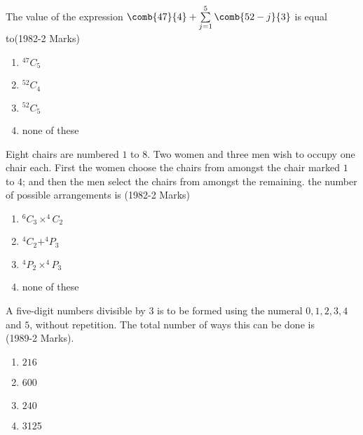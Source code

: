 \iffalse
\title{Assignments}
\author{Mokshith ee24btech11009}
\section{mcq-single}
\fi
    \item  The value of the expression $\comb{47}{4}+\sum\limits_{j=1}^{5} \comb{52-j}{3}$ is equal to\hfill{(1982-2 Marks)}\\
\begin{multicols}{2} 
\begin{enumerate}
\item $^{47}C_5$
\item$^{52}C_4$
\columnbreak
\item $^{52}C_5$
\item none of these\\
\end{enumerate}
\end{multicols}
\item Eight chairs are numbered $1$ to $8$. Two women and three men wish to occupy one chair each. First the women choose the chairs from amongst the chair marked $1$ to $4$; and then the men select the chairs from amongst the remaining. the number of possible arrangements is
\hfill{(1982-2 Marks)}\\
\begin{multicols}{2} 
\begin{enumerate}
\item $^6C_3\times^4C_2$
\item $^4C_2+^4P_3$\columnbreak
\item $^4P_2\times^4P_3$
\item none of these\\[4pt]
\end{enumerate}
\end{multicols}
\item A five-digit numbers divisible by $3$ is to be formed using the numeral $0,1,2,3,4$ and $ 5$, without repetition. The total number of ways this can be done is\\
\hspace*{\fill}(1989-2 Marks).
\begin{multicols}{2} 
\begin{enumerate}
\item $216$\item  600\columnbreak\item $240$\item 3125\\
\end{enumerate}
\end{multicols}
